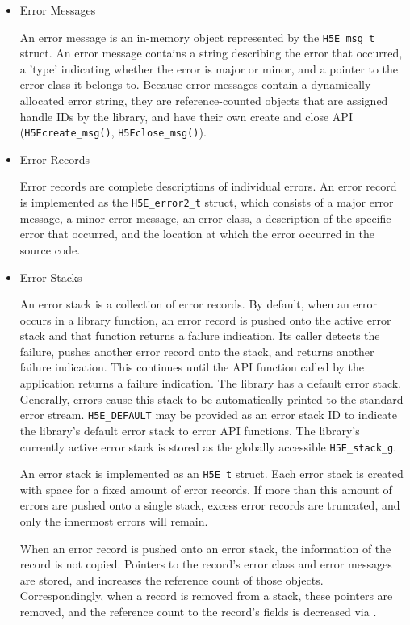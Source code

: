 \begin{itemize}

\item Error Messages

An error message is an in-memory object represented by the \texttt{H5E\_msg\_t} struct. An error message contains a string describing the error that occurred, a 'type' indicating whether the error is major or minor, and a pointer to the error class it belongs to. Because error messages contain a dynamically allocated error string, they are reference-counted objects that are assigned handle IDs by the library, and have their own create and close API (\texttt{H5Ecreate\_msg()}, \texttt{H5Eclose\_msg()}).

\item Error Records

Error records are complete descriptions of individual errors. An error record is implemented as the \texttt{H5E\_error2\_t} struct, which consists of a major error message, a minor error message, an error class, a description of the specific error that occurred, and the location at which the error occurred in the source code.

\item Error Stacks

An error stack is a collection of error records. By default, when an error occurs in a library function, an error record is pushed onto the active error stack and that function returns a failure indication. Its caller detects the failure, pushes another error record onto the stack, and returns another failure indication. This continues until the API function called by the application returns a failure indication. The library has a default error stack. Generally, errors cause this stack to be automatically printed to the standard error stream. \texttt{H5E\_DEFAULT} may be provided as an error stack ID to indicate the library's default error stack to error API functions. The library's currently active error stack is stored as the globally accessible \texttt{H5E\_stack\_g}.

An error stack is implemented as an \texttt{H5E\_t} struct. Each error stack is created with space for a fixed amount of error records. If more than this amount of errors are pushed onto a single stack, excess error records are truncated, and only the innermost errors will remain.

When an error record is pushed onto an error stack, the information of the record is not copied. Pointers to the record's error class and error messages are stored, and  increases the reference count of those objects. Correspondingly, when a record is removed from a stack, these pointers are removed, and the reference count to the record's fields is decreased via .


\end{itemize}

